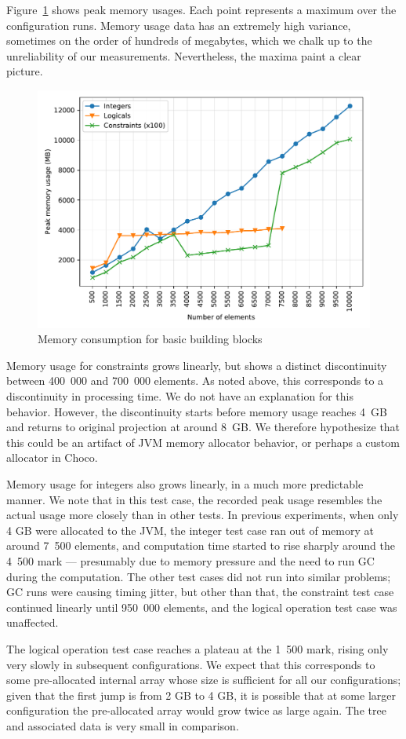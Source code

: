 \medskip

Figure~\ref{fig:variables:mem} shows peak memory usages. Each point represents a maximum
over the configuration runs. Memory usage data has an extremely high variance, sometimes
on the order of hundreds of megabytes, which we chalk up to the unreliability of our
measurements. Nevertheless, the maxima paint a clear picture.

\begin{figure}[t]
    \centering
    \includegraphics[width=1\linewidth]{img/variablemem.pdf}
    \caption{Memory consumption for basic building blocks}
    \label{fig:variables:mem}
\end{figure}

Memory usage for constraints grows linearly, but shows a distinct discontinuity between
400~000 and 700~000 elements. As noted above, this corresponds to a discontinuity in
processing time. We do not have an explanation for this behavior. However, the
discontinuity starts before memory usage reaches 4~GB and returns to original projection
at around 8~GB. We therefore hypothesize that this could be an artifact of JVM memory
allocator behavior, or perhaps a custom allocator in Choco.

Memory usage for integers also grows linearly, in a much more predictable manner. We
note that in this test case, the recorded peak usage resembles the actual usage more
closely than in other tests. In previous experiments, when only 4 GB were allocated to
the JVM, the integer test case ran out of memory at around 7~500 elements, and
computation time started to rise sharply around the 4~500 mark --- presumably due to
memory pressure and the need to run GC during the computation. The other test cases did
not run into similar problems; GC runs were causing timing jitter, but other than that,
the constraint test case continued linearly until 950~000 elements, and the logical
operation test case was unaffected.

The logical operation test case reaches a plateau at the 1~500 mark, rising only very
slowly in subsequent configurations. We expect that this corresponds to some
pre-allocated internal array whose size is sufficient for all our configurations; given
that the first jump is from 2 GB to 4 GB, it is possible that at some larger
configuration the pre-allocated array would grow twice as large again. The 
tree and associated data is very small in comparison.
